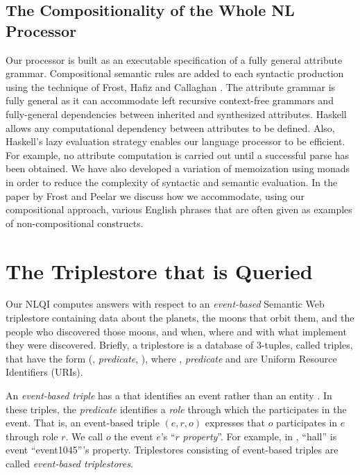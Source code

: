 \documentclass[../main.tex]{subfiles}
\begin{document}
\begin{refsection}
\subsection{The Compositionality of the Whole NL Processor}

Our processor is built as an executable specification of a fully general attribute grammar. Compositional semantic rules are added to each syntactic production using the technique of Frost, Hafiz and Callaghan \cite{frost2008parser}. The attribute grammar is fully general as it can accommodate left recursive context-free grammars and fully-general dependencies between inherited and synthesized attributes. Haskell allows any computational dependency between attributes to be defined. Also, Haskell’s lazy evaluation strategy enables our language processor to be efficient. For example, no attribute computation is carried out until a successful parse has been obtained. We have also developed a variation of memoization using monads \cite{frost2008parser} in order to reduce the complexity of syntactic and semantic evaluation.
In the paper by Frost and Peelar \cite{frostpeelar2019} we discuss how we accommodate, using our compositional approach, various English phrases that are often given as examples of non-compositional constructs.

\section{The Triplestore that is Queried}
\label{webist2019journal:triplestore}
Our NLQI computes answers with respect to an \textit{event-based} Semantic Web triplestore containing data about the planets, the moons that orbit them, and the people who discovered those moons, and when, where and with what implement they were discovered.  Briefly, a triplestore is a database of 3-tuples, called triples, that have the form (, \textit{predicate}, ), where , \textit{predicate} and  are Uniform Resource Identifiers (URIs).

An \textit{event-based triple} has a  that identifies an event rather than an entity \cite{peelar2016accommodating}. In these triples, the \textit{predicate} identifies a \textit{role} through which the  participates in the event.  That is, an event-based triple $(e,r,o)$ expresses that $o$ participates in $e$ through role $r$.
We call $o$ the event $e$'s ``$r$ \textit{property}''. For example, in , ``hall'' is event ``event1045'''s  property. Triplestores consisting of event-based triples are called \textit{event-based triplestores}.


\end{refsection}
\end{document}
